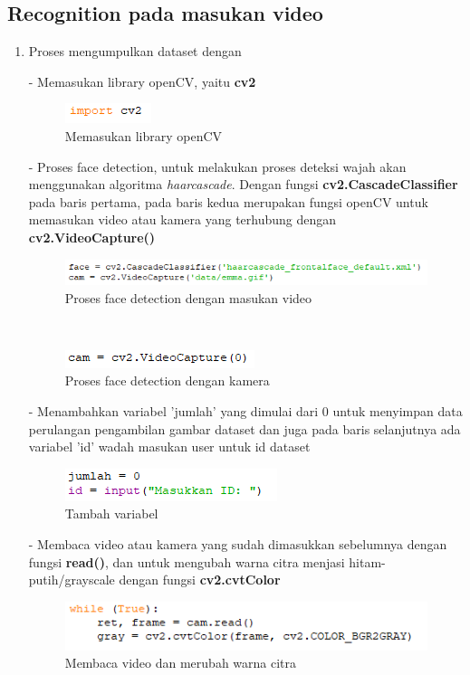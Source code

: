 
\subsection{Recognition pada masukan video}
\begin{enumerate}[1.]
\item Proses mengumpulkan dataset dengan

- Memasukan library openCV, yaitu \textbf{cv2}
\begin{figure}[h!]
    \centering
    \includegraphics[width=0.3\linewidth]{images/fr_1.PNG}
    \caption{Memasukan library openCV}
\end{figure}

-  Proses face detection, untuk melakukan proses deteksi wajah akan menggunakan algoritma \emph{haarcascade}. Dengan fungsi \textbf{cv2.CascadeClassifier} pada baris pertama, 
pada baris kedua merupakan fungsi openCV untuk memasukan video atau kamera yang terhubung dengan \textbf{cv2.VideoCapture()}
\begin{figure}[h!]
    \centering
    \includegraphics[width=0.85\linewidth]{images/fr_2.PNG}
    \caption{Proses face detection dengan masukan video}
\end{figure}\\
\begin{figure}[h!]
    \centering
    \includegraphics[width=0.5\linewidth]{images/fr_camera.PNG}
    \caption{Proses face detection dengan kamera}
\end{figure}

- Menambahkan variabel 'jumlah' yang dimulai dari 0 untuk menyimpan data perulangan pengambilan gambar dataset
dan juga pada baris selanjutnya ada variabel 'id' wadah masukan user untuk id dataset
\begin{figure}[h!]
    \centering
    \includegraphics[width=0.45\linewidth]{images/fr_3.PNG}
    \caption{Tambah variabel}
\end{figure}
\newpage
- Membaca video atau kamera yang sudah dimasukkan sebelumnya dengan fungsi \textbf{read()}, dan untuk mengubah warna citra menjasi hitam-putih/grayscale
dengan fungsi \textbf{cv2.cvtColor}
\begin{figure}[h!]
    \centering
    \includegraphics[width=0.85\linewidth]{images/fr_4.PNG}
    \caption{Membaca video dan merubah warna citra}
\end{figure}


\end{enumerate}
